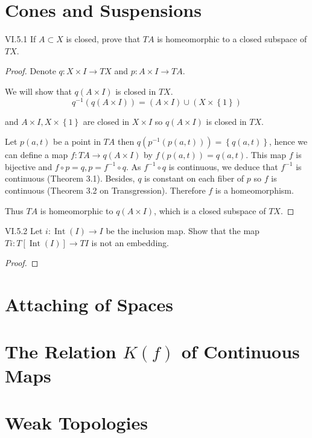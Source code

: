 \section{Cones and Suspensions}

\begin{problem}{VI.5.1}
If \( A \subset X \) is closed, prove that \( TA \) is homeomorphic to a closed subspace of \( TX \).
\end{problem}

\begin{proof}
	Denote \( q: X \times I \to TX \) and \( p: A \times I \to TA \).

	We will show that \( q(A \times I) \) is closed in \( TX \).
	\[
		q^{-1}(q(A \times I)) = (A \times I) \cup (X \times \left\{ 1 \right\})
	\]

	and \( A \times I, X \times \left\{ 1 \right\} \) are closed in \( X \times I \) so \( q(A \times I) \) is closed in \( TX \).

	Let \( p(a, t) \) be a point in \( TA \) then \( q(p^{-1}(p(a, t))) = \left\{ q(a, t) \right\} \), hence we can define a map \( f: TA \to q(A \times I) \) by \( f(p(a, t)) = q(a, t) \). This map \( f \) is bijective and \( f \circ p = q, p = f^{-1} \circ q \). As \( f^{-1} \circ q \) is continuous, we deduce that \( f^{-1} \) is continuous (Theorem 3.1). Besides, \( q \) is constant on each fiber of \( p \) so \( f \) is continuous (Theorem 3.2 on Transgression). Therefore \( f \) is a homeomorphism.

	Thus \( TA \) is homeomorphic to \( q(A\times I) \), which is a closed subspace of \( TX \).
\end{proof}

\begin{problem}{VI.5.2}
Let \( i: \operatorname{Int}(I) \to I \) be the inclusion map. Show that the map \( Ti: T[\operatorname{Int}(I)] \to TI \) is not an embedding.
\end{problem}

\begin{proof}
\end{proof}

\section{Attaching of Spaces}

\section{The Relation \(K(f)\) of Continuous Maps}

\section{Weak Topologies}
